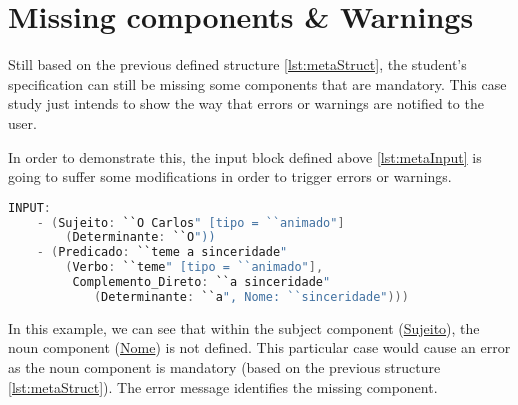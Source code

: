%
%
%
%
%

\section{Missing components \& Warnings}
Still based on the previous defined structure \autoref{lst:metaStruct}, the student's specification can still be missing some components that are mandatory. 
This case study just intends to show the way that errors or warnings are notified to the user.

In order to demonstrate this, the input block defined above \autoref{lst:metaInput} is going to suffer some modifications in order to trigger errors or warnings.

\begin{center}
\begin{minipage}{13cm}
\begin{lstlisting}[language=java, basicstyle=\small, label={lst:meta_input_missing_comp}, caption=Example of the students parsing with missing component]
INPUT:
    - (Sujeito: ``O Carlos" [tipo = ``animado"]
        (Determinante: ``O"))
    - (Predicado: ``teme a sinceridade" 
        (Verbo: ``teme" [tipo = ``animado"], 
         Complemento_Direto: ``a sinceridade" 
            (Determinante: ``a", Nome: ``sinceridade")))
\end{lstlisting}
\end{minipage}
\end{center}

In this example, we can see that within the subject component (\underline{Sujeito}), the noun component (\underline{Nome}) is not defined. 
This particular case would cause an error as the noun component is mandatory (based on the previous structure \autoref{lst:metaStruct}). 
The error message identifies the missing component.

